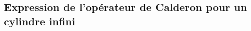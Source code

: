 \documentclass[12pt,%
    twoside,%
    a4paper,%
    openright, %
    ]{book}
\numberwithin{equation}{section} %
\renewcommand{\frac}[2]{\dfrac{#1}{#2}} %
\newcounter{REM}
\newenvironment{REM}[1][\theREM]
    {%
        \stepcounter{REM}
        \hypertarget{REM#1}{}%
        \pdfbookmark[0]{REM \theREM}{REM#1}
        \begin{tcolorbox}[%
                title={Remarque \theREM},%
                colback=red!30!white,%
                colframe=red!75!black,%
            ]
    }
    {
        \end{tcolorbox}%
    }%
\begin{document}
    \subsection{Expression de l'opérateur de Calderon pour un cylindre infini}

        

\end{document}
